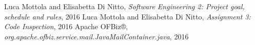 	Luca Mottola and Elisabetta Di Nitto, \emph{Software Engineering 2: Project goal, schedule and rules}, 2016
	Luca Mottola and Elisabetta Di Nitto, \emph{Assignment 3: Code Inspection}, 2016
	Apache OFBiz®, \emph{org.apache.ofbiz.service.mail.JavaMailContainer.java}, 2016
	